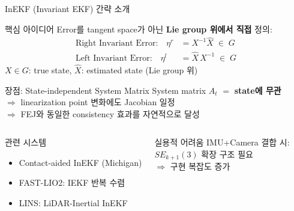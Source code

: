 \begin{frame}[shrink=10]{InEKF (Invariant EKF) 간략 소개}
  \begin{block}{핵심 아이디어}
    Error를 tangent space가 아닌 \textbf{Lie group 위에서 직접} 정의:
    \begin{align*}
      \text{Right Invariant Error:} \quad \eta^r &= X^{-1}\hat{X} \;\in\; G \\
      \text{Left Invariant Error:} \quad \eta^l &= \hat{X}\,X^{-1} \;\in\; G
    \end{align*}
    $X \in G$: true state, $\hat{X}$: estimated state (Lie group 위)
  \end{block}
  \begin{block}{장점: State-independent System Matrix}
    System matrix $A_t$ $=$ \textbf{state에 무관}\\
    $\Rightarrow$ linearization point 변화에도 Jacobian 일정\\
    $\Rightarrow$ FEJ와 동일한 consistency 효과를 자연적으로 달성
  \end{block}
  \begin{columns}[T]
      \begin{exampleblock}{관련 시스템}
        \begin{itemize}
          \item Contact-aided InEKF (Michigan)
          \item FAST-LIO2: IEKF 반복 수렴
          \item LINS: LiDAR-Inertial InEKF
        \end{itemize}
      \end{exampleblock}
      \begin{alertblock}{실용적 어려움}
        IMU+Camera 결합 시:\\
        $SE_{k+1}(3)$ 확장 구조 필요\\
        $\Rightarrow$ 구현 복잡도 증가
      \end{alertblock}
  \end{columns}
\end{frame}



